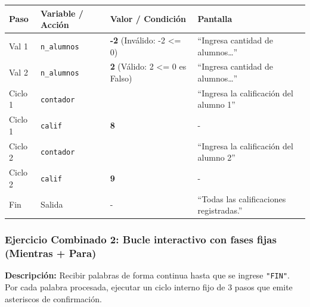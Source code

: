 {\def\LTcaptype{none} %
\begin{longtable}[]{@{}
  >{\centering\arraybackslash}p{}
  >{\centering\arraybackslash}p{}
  >{\centering\arraybackslash}p{}
  >{\raggedright\arraybackslash}p{}@{}}
\toprule\noalign{}
\begin{minipage}[b]{\linewidth}\centering
Paso
\end{minipage} & \begin{minipage}[b]{\linewidth}\centering
Variable / Acción
\end{minipage} & \begin{minipage}[b]{\linewidth}\centering
Valor / Condición
\end{minipage} & \begin{minipage}[b]{\linewidth}\raggedright
Pantalla
\end{minipage} \\
\midrule\noalign{}
\endhead
\bottomrule\noalign{}
\endlastfoot
Val 1 & \texttt{n\_alumnos} & \textbf{-2} (Inválido: -2 \textless= 0) &
``Ingresa cantidad de alumnos\ldots{}'' \\
Val 2 & \texttt{n\_alumnos} & \textbf{2} (Válido: 2 \textless= 0 es
Falso) & ``Ingresa cantidad de alumnos\ldots{}'' \\
Ciclo 1 & \texttt{contador} & 1 & ``Ingresa la calificación del alumno
1'' \\
Ciclo 1 & \texttt{calif} & \textbf{8} & - \\
Ciclo 2 & \texttt{contador} & 2 & ``Ingresa la calificación del alumno
2'' \\
Ciclo 2 & \texttt{calif} & \textbf{9} & - \\
Fin & Salida & - & ``Todas las calificaciones registradas.'' \\
\end{longtable}
}

\subsubsection{Ejercicio Combinado 2: Bucle interactivo con fases fijas
(Mientras +
Para)}\label{ejercicio-combinado-2-bucle-interactivo-con-fases-fijas-mientras-para}

\textbf{Descripción:} Recibir palabras de forma continua hasta que se
ingrese \texttt{"FIN"}. Por cada palabra procesada, ejecutar un ciclo
interno fijo de 3 pasos que emite asteriscos de confirmación.

